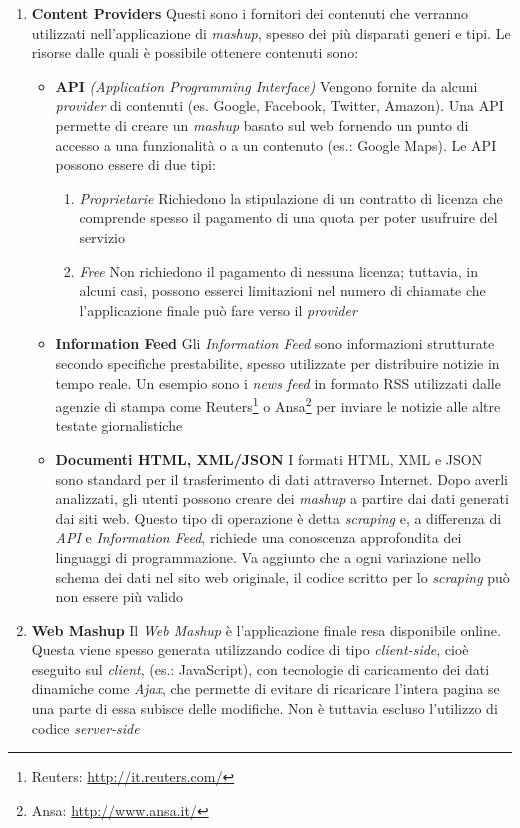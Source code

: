 \begin{enumerate}
	\item \textbf{Content Providers}
	Questi sono i fornitori dei contenuti che verranno utilizzati nell'applicazione di \emph{mashup}, spesso dei più disparati generi e tipi.
	Le risorse dalle quali è possibile ottenere contenuti sono:
	\begin{itemize}
		\item \textbf{API}
		\emph{(Application Programming Interface)} Vengono fornite da alcuni \emph{provider} di contenuti (es. Google, Facebook, Twitter, Amazon). Una API permette di creare un \emph{mashup} basato sul web fornendo un punto di accesso a una funzionalità o a un contenuto (es.: Google Maps). Le API possono essere di due tipi:
		\begin{enumerate}
			\item \emph{Proprietarie}
			Richiedono la stipulazione di un contratto di licenza che comprende spesso il pagamento di una quota per poter usufruire del servizio
			\item \emph{Free}
			Non richiedono il pagamento di nessuna licenza; tuttavia, in alcuni casi, possono esserci limitazioni nel numero di chiamate che l'applicazione finale può fare verso il \emph{provider}
		\end{enumerate} 
		\item \textbf{Information Feed}
		Gli \emph{Information Feed} sono informazioni strutturate secondo specifiche prestabilite, spesso utilizzate per distribuire notizie in tempo reale. Un esempio sono i \emph{news feed }in formato RSS utilizzati dalle agenzie di stampa come Reuters\footnote{Reuters: \url{http://it.reuters.com/}} o Ansa\footnote{Ansa: \url{http://www.ansa.it/}} per inviare le notizie alle altre testate giornalistiche
		\item \textbf{Documenti HTML, XML/JSON}
		I formati HTML, XML e JSON sono standard per il trasferimento di dati attraverso Internet. Dopo averli analizzati, gli utenti possono creare dei \emph{mashup} a partire dai dati generati dai siti web. Questo tipo di operazione è detta \emph{scraping} e, a differenza di \emph{API} e \emph{Information Feed}, richiede una conoscenza approfondita dei linguaggi di programmazione. Va aggiunto che a ogni variazione nello schema dei dati nel sito web originale, il codice scritto per lo \emph{scraping} può non essere più valido
	\end{itemize} 
	\item \textbf{Web Mashup}
	Il \emph{Web Mashup} è l'applicazione finale resa disponibile online. Questa viene spesso generata utilizzando codice di tipo \emph{client-side}, cioè eseguito sul \emph{client}, (es.: JavaScript), con tecnologie di caricamento dei dati dinamiche come \emph{Ajax}, che permette di evitare di ricaricare l'intera pagina se una parte di essa subisce delle modifiche. Non è tuttavia escluso l'utilizzo di codice \emph{server-side}
\end{enumerate}

